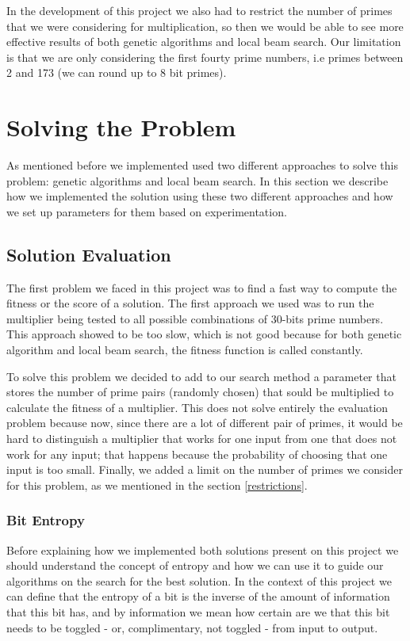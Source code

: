 \documentclass[12pt]{article}
\begin{document}
In the development of this project we also had to restrict the number of primes that we were considering for multiplication, so then we would be able to see more effective results of both genetic algorithms and local beam search. Our limitation is that we are only considering the first fourty prime numbers, i.e primes between 2 and 173 (we can round up to 8 bit primes).

\section{Solving the Problem}
As mentioned before we implemented used two different approaches to solve this problem: genetic algorithms and local beam search. In this section we describe how we implemented the solution using these two different approaches and how we set up parameters for them based on experimentation.

\subsection{Solution Evaluation}
The first problem we faced in this project was to find a fast way to compute the fitness or the score of a solution. The first approach we used was to run the multiplier being tested to all possible combinations of 30-bits prime numbers. This approach showed to be too slow, which is not good because for both genetic algorithm and local beam search, the fitness function is called constantly.

To solve this problem we decided to add to our search method a parameter that stores the number of prime pairs (randomly chosen) that sould be multiplied to calculate the fitness of a multiplier. This does not solve entirely the evaluation problem because now, since there are a lot of different pair of primes, it would be hard to distinguish a multiplier that works for one input from one that does not work for any input; that happens because the probability of choosing that one input is too small. Finally, we added a limit on the number of primes we consider for this problem, as we mentioned in the section \ref{restrictions}.

\subsubsection{Bit Entropy}
Before explaining how we implemented both solutions present on this project we should understand the concept of entropy and how we can use it to guide our algorithms on the search for the best solution. In the context of this project we can define that the entropy of a bit is the inverse of the amount of information that this bit has, and by information we mean how certain are we that this bit needs to be toggled - or, complimentary, not toggled - from input to output. 
\end{document}

